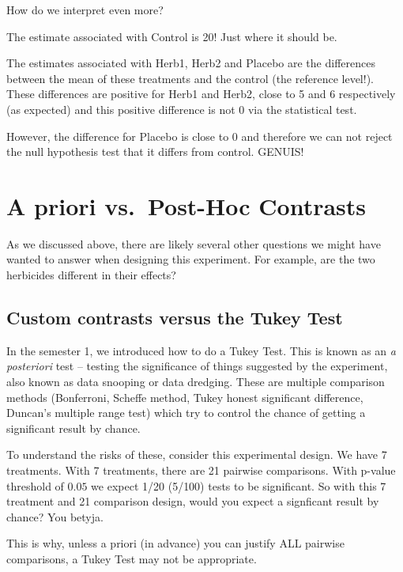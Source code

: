 \documentclass[
]{book}
\begin{document}
How do we interpret even more?

The estimate associated with Control is 20! Just where it should be.

The estimates associated with Herb1, Herb2 and Placebo are the differences between the mean of these treatments and the control (the reference level!). These differences are positive for Herb1 and Herb2, close to 5 and 6 respectively (as expected) and this positive difference is not 0 via the statistical test.

However, the difference for Placebo is close to 0 and therefore we can not reject the null hypothesis test that it differs from control. GENUIS!

\hypertarget{a-priori-vs.-post-hoc-contrasts}{%
\section{A priori vs.~Post-Hoc Contrasts}\label{a-priori-vs.-post-hoc-contrasts}}

As we discussed above, there are likely several other questions we might have wanted to answer when designing this experiment. For example, are the two herbicides different in their effects?

\hypertarget{custom-contrasts-versus-the-tukey-test}{%
\subsection{Custom contrasts versus the Tukey Test}\label{custom-contrasts-versus-the-tukey-test}}

In the semester 1, we introduced how to do a Tukey Test. This is known as an \emph{a posteriori} test -- testing the significance of things suggested by the experiment, also known as data snooping or data dredging. These are multiple comparison methods (Bonferroni, Scheffe method, Tukey honest significant difference, Duncan's multiple range test) which try to control the chance of getting a significant result by chance.

To understand the risks of these, consider this experimental design. We have 7 treatments. With 7 treatments, there are 21 pairwise comparisons. With p-value threshold of \(0.05\) we expect 1/20 (5/100) tests to be significant. So with this 7 treatment and 21 comparison design, would you expect a signficant result by chance? You betyja.

This is why, unless a priori (in advance) you can justify ALL pairwise comparisons, a Tukey Test may not be appropriate.
\end{document}
